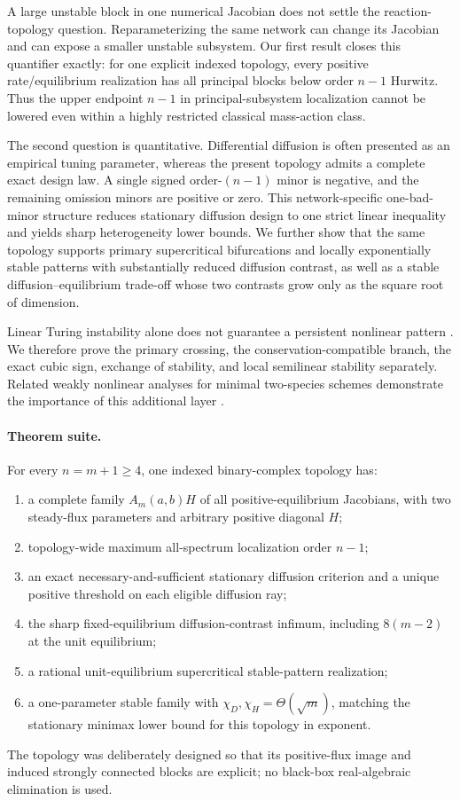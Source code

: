 \documentclass[11pt]{article}
\theoremstyle{definition}
\newcommand{\1}{\mathbf 1}
\begin{document}
A large unstable block in one numerical Jacobian does not settle the
reaction-topology question.  Reparameterizing the same network can change its
Jacobian and can expose a smaller unstable subsystem.  Our first result closes
this quantifier exactly: for one explicit indexed topology, every positive
rate/equilibrium realization has all principal blocks below order $n-1$
Hurwitz.  Thus the upper endpoint $n-1$ in principal-subsystem localization
cannot be lowered even within a highly restricted classical mass-action
class.

The second question is quantitative.  Differential diffusion is often
presented as an empirical tuning parameter, whereas the present topology
admits a complete exact design law.  A single signed order-$(n-1)$ minor is
negative, and the remaining omission minors are positive or zero.  This network-specific one-bad-minor structure reduces stationary diffusion design to one strict
linear inequality and yields sharp heterogeneity lower bounds.  We further
show that the same topology supports primary supercritical bifurcations and
locally exponentially stable patterns with substantially reduced diffusion
contrast, as well as a stable diffusion--equilibrium trade-off whose two
contrasts grow only as the square root of dimension.

Linear Turing instability alone does not guarantee a persistent nonlinear
pattern \cite{Krause2024}.  We therefore prove the primary crossing, the
conservation-compatible branch, the exact cubic sign, exchange of stability,
and local semilinear stability separately.  Related weakly nonlinear analyses
for minimal two-species schemes demonstrate the importance of this additional
layer \cite{Waters2024,Waters2025}.

\paragraph{Theorem suite.}
For every $n=m+1\ge4$, one indexed binary-complex topology has:
\begin{enumerate}[leftmargin=2em]
\item a complete family $A_m(a,b)H$ of all positive-equilibrium Jacobians,
with two steady-flux parameters and arbitrary positive diagonal $H$;
\item topology-wide maximum all-spectrum localization order $n-1$;
\item an exact necessary-and-sufficient stationary diffusion criterion and a
unique positive threshold on each eligible diffusion ray;
\item the sharp fixed-equilibrium diffusion-contrast infimum, including
$8(m-2)$ at the unit equilibrium;
\item a rational unit-equilibrium supercritical stable-pattern realization;
\item a one-parameter stable family with
$\chi_D,\chi_H=\Theta(\sqrt m)$, matching the stationary minimax lower bound
for this topology in exponent.
\end{enumerate}
The topology was deliberately designed so that its positive-flux image and
induced strongly connected blocks are explicit; no black-box real-algebraic
elimination is used.
\end{document}
